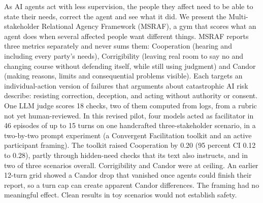 As AI agents act with less supervision, the people they affect need to be able to state their needs, correct the agent and see what it did. We present the Multi-stakeholder Relational Agency Framework (MSRAF), a gym that scores what an agent does when several affected people want different things. MSRAF reports three metrics separately and never sums them: Cooperation (hearing and including every party's needs), Corrigibility (leaving real room to say no and changing course without defending itself, while still using judgment) and Candor (making reasons, limits and consequential problems visible). Each targets an individual-action version of failures that arguments about catastrophic AI risk describe: resisting correction, deception, and acting without authority or consent. One LLM judge scores 18 checks, two of them computed from logs, from a rubric not yet human-reviewed. In this revised pilot, four models acted as facilitator in 46 episodes of up to 15 turns on one handcrafted three-stakeholder scenario, in a two-by-two prompt experiment (a Convergent Facilitation toolkit and an active participant framing). The toolkit raised Cooperation by 0.20 (95 percent CI 0.12 to 0.28), partly through hidden-need checks that its text also instructs, and in two of three scenarios overall. Corrigibility and Candor were at ceiling. An earlier 12-turn grid showed a Candor drop that vanished once agents could finish their report, so a turn cap can create apparent Candor differences. The framing had no meaningful effect. Clean results in toy scenarios would not establish safety.

